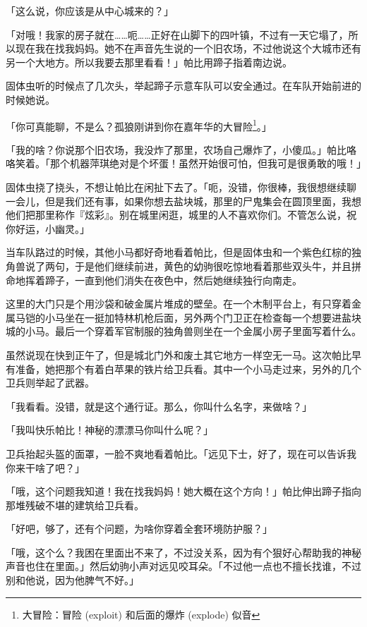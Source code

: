 「这么说，你应该是从中心城来的？」

「对哦！我家的房子就在……呃……正好在山脚下的四叶镇，不过有一天它塌了，所以现在我在找我妈妈。她不在声音先生说的一个旧农场，不过他说这个大城市还有另一个大地方。所以我要去那里看看！」帕比用蹄子指着南边说。

固体虫听的时候点了几次头，举起蹄子示意车队可以安全通过。在车队开始前进的时候她说。

「你可真能聊，不是么？孤狼刚讲到你在嘉年华的大冒险\footnote{大冒险：冒险 (exploit) 和后面的爆炸 (explode) 似音}。」

「我的啥？你说那个旧农场，我没炸了那里，农场自己爆炸了，小傻瓜。」帕比咯咯笑着。「那个机器萍琪绝对是个坏蛋！虽然开始很可怕，但我可是很勇敢的哦！」

固体虫挠了挠头，不想让帕比在闲扯下去了。「呃，没错，你很棒，我很想继续聊一会儿，但是我们还有事，如果你想去盐块城，那里的尸鬼集会在圆顶里面，我想他们把那里称作『炫彩』。别在城里闲逛，城里的人不喜欢你们。不管怎么说，祝你好运，小幽灵。」

当车队路过的时候，其他小马都好奇地看着帕比，但是固体虫和一个紫色红棕的独角兽说了两句，于是他们继续前进，黄色的幼驹很吃惊地看着那些双头牛，并且拼命地挥着蹄子，一直到他们消失在夜色中，然后她继续独行向南走。

\horizonline


这里的大门只是个用沙袋和破金属片堆成的壁垒。在一个木制平台上，有只穿着金属马铠的小马坐在一挺加特林机枪后面，另外两个门卫正在检查每一个想要进盐块城的小马。最后一个穿着军官制服的独角兽则坐在一个金属小房子里面写着什么。

虽然说现在快到正午了，但是城北门外和废土其它地方一样空无一马。这次帕比早有准备，她把那个有着白苹果的铁片给卫兵看。其中一个小马走过来，另外的几个卫兵则举起了武器。

「我看看。没错，就是这个通行证。那么，你叫什么名字，来做啥？」

「我叫快乐帕比！神秘的漂漂马你叫什么呢？」

卫兵抬起头盔的面罩，一脸不爽地看着帕比。「远见下士，好了，现在可以告诉我你来干啥了吧？」

「哦，这个问题我知道！我在找我妈妈！她大概在这个方向！」帕比伸出蹄子指向那堆残破不堪的建筑给卫兵看。

「好吧，够了，还有个问题，为啥你穿着全套环境防护服？」

「哦，这个么？我困在里面出不来了，不过没关系，因为有个狠好心帮助我的神秘声音也住在里面。」然后幼驹小声对远见咬耳朵。「不过他一点也不擅长找谁，不过别和他说，因为他脾气不好。」

